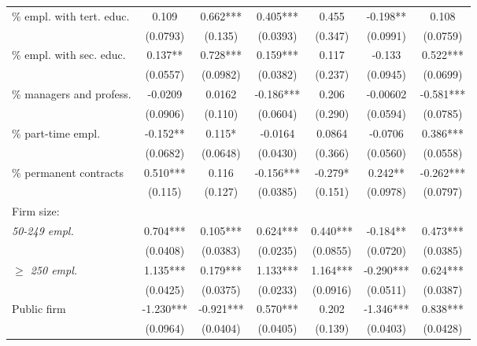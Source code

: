 \begin{threeparttable}
\begin{tabular}{l*{6}{S}}
\% empl. with tert. educ. &  0.109     & 0.662***  & 0.405***   & 0.455     & -0.198**   & 0.108      \\
                          &  (0.0793)  & (0.135)   & (0.0393)   & (0.347)   & (0.0991)   & (0.0759)   \\[0.5ex]

\% empl. with sec. educ.  &  0.137**   & 0.728***  & 0.159***   & 0.117     & -0.133     & 0.522***   \\
                          &  (0.0557)  & (0.0982)  & (0.0382)   & (0.237)   & (0.0945)   & (0.0699)   \\[0.5ex]

\% managers and profess.  &  -0.0209   & 0.0162    & -0.186***  & 0.206     & -0.00602   & -0.581***  \\
                          &  (0.0906)  & (0.110)   & (0.0604)   & (0.290)   & (0.0594)   & (0.0785)   \\[0.5ex]

\% part-time empl.        &  -0.152**  & 0.115*    & -0.0164    & 0.0864    & -0.0706    & 0.386***   \\
                          &  (0.0682)  & (0.0648)  & (0.0430)   & (0.366)   & (0.0560)   & (0.0558)   \\[0.5ex]

\% permanent contracts    &  0.510***  & 0.116     & -0.156***  & -0.279*   & 0.242**    & -0.262***  \\
                          &  (0.115)   & (0.127)   & (0.0385)   & (0.151)   & (0.0978)   & (0.0797)   \\[0.5ex]

Firm size:                \\[1ex]
\quad \textit{50-249 empl.}              &  0.704***  & 0.105***  & 0.624***   & 0.440***  & -0.184**   & 0.473***   \\
                          &  (0.0408)  & (0.0383)  & (0.0235)   & (0.0855)  & (0.0720)   & (0.0385)   \\[0.5ex]

\quad \textit{$\geq$ 250 empl.}         &  1.135***  & 0.179***  & 1.133***   & 1.164***  & -0.290***  & 0.624***   \\
                          &  (0.0425)  & (0.0375)  & (0.0233)   & (0.0916)  & (0.0511)   & (0.0387)   \\[0.5ex]

Public firm               &  -1.230*** & -0.921*** & 0.570***   & 0.202     & -1.346***  & 0.838***   \\
                          &  (0.0964)  & (0.0404)  & (0.0405)   & (0.139)   & (0.0403)   & (0.0428)   \\[0.5ex]


\end{tabular}
\end{threeparttable}
